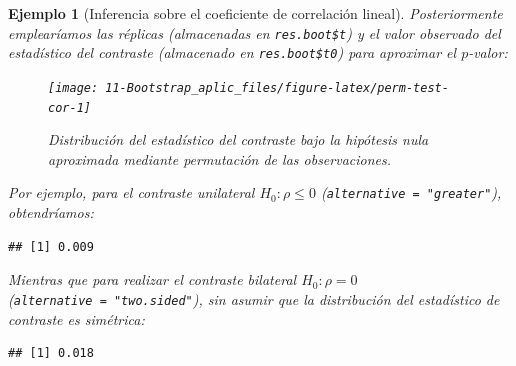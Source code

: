 \documentclass[
]{book}
\newenvironment{Shaded}{\begin{snugshade}}{\end{snugshade}}
\newcommand{\AttributeTok}[1]{\textcolor[rgb]{0.77,0.63,0.00}{#1}}
\newcommand{\ConstantTok}[1]{\textcolor[rgb]{0.00,0.00,0.00}{#1}}
\newcommand{\DecValTok}[1]{\textcolor[rgb]{0.00,0.00,0.81}{#1}}
\newcommand{\FunctionTok}[1]{\textcolor[rgb]{0.00,0.00,0.00}{#1}}
\newcommand{\NormalTok}[1]{#1}
\newcommand{\OtherTok}[1]{\textcolor[rgb]{0.56,0.35,0.01}{#1}}
\newcommand{\SpecialCharTok}[1]{\textcolor[rgb]{0.00,0.00,0.00}{#1}}
\newcommand{\StringTok}[1]{\textcolor[rgb]{0.31,0.60,0.02}{#1}}
\theoremstyle{break}
\newtheorem{example}{Ejemplo}[chapter]
\theoremstyle{nonumberplain}
\begin{document}
\begin{example}[Inferencia sobre el coeficiente de correlación lineal]
Posteriormente emplearíamos las réplicas (almacenadas en \texttt{res.boot\$t}) y el valor
observado del estadístico del contraste (almacenado en \texttt{res.boot\$t0})
para aproximar el \(p\)-valor:

\begin{Shaded}
\end{Shaded}

\begin{figure}[!htb]

{\centering \texttt{[image: 11-Bootstrap\_aplic\_files/figure-latex/perm-test-cor-1]} 

}

\caption{Distribución del estadístico del contraste bajo la hipótesis nula aproximada mediante permutación de las observaciones.}\label{fig:perm-test-cor}
\end{figure}

Por ejemplo, para el contraste unilateral \(H_0: \rho \leq 0\)
(\texttt{alternative\ =\ "greater"}), obtendríamos:

\begin{Shaded}
\end{Shaded}

\begin{verbatim}
## [1] 0.009
\end{verbatim}

Mientras que para realizar el contraste bilateral \(H_0: \rho = 0\)
(\texttt{alternative\ =\ "two.sided"}), sin asumir que
la distribución del estadístico de contraste es simétrica:

\begin{Shaded}
\end{Shaded}

\begin{verbatim}
## [1] 0.018
\end{verbatim}

\end{example}
\end{document}
